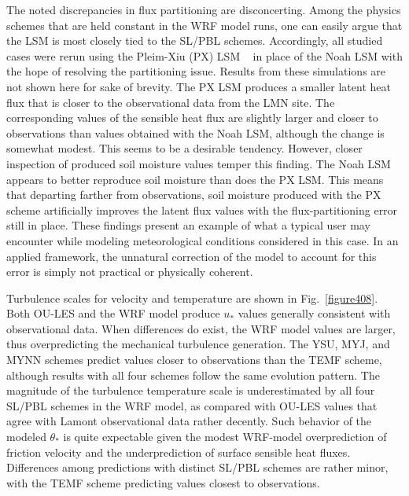 The noted discrepancies in flux partitioning are disconcerting. Among the physics schemes that are held constant in the WRF model runs, one can easily argue that the LSM is most closely tied to the SL\slash PBL schemes. Accordingly, all studied cases were rerun using the Pleim-Xiu (PX) LSM ~\citep{PleimXiu95, XiuPleim01} in place of the Noah LSM with the hope of resolving the partitioning issue. Results from these simulations are not shown here for sake of brevity. The PX LSM produces a smaller latent heat flux that is closer to the observational data from the LMN site. The corresponding values of the sensible heat flux are slightly larger and closer to observations than values obtained with the Noah LSM, although the change is somewhat modest. This seems to be a desirable tendency. However, closer inspection of produced soil moisture values temper this finding. The Noah LSM appears to better reproduce soil moisture than does the PX LSM. This means that departing farther from observations, soil moisture produced with the PX scheme artificially improves the latent flux values with the flux-partitioning error still in place. These findings present an example of what a typical user may encounter while modeling meteorological conditions considered in this case. In an applied framework, the unnatural correction of the model to account for this error is simply not practical or physically coherent.

Turbulence scales for velocity and temperature are shown in Fig.~\ref{figure408}. Both OU-LES and the WRF model produce $u_*$ values generally consistent with observational data. When differences do exist, the WRF model values are larger, thus overpredicting the mechanical turbulence generation. The YSU, MYJ, and MYNN schemes predict values closer to observations than the TEMF scheme, although results with all four schemes follow the same evolution pattern. The magnitude of the turbulence temperature scale is underestimated by all four SL\slash PBL schemes in the WRF model, as compared with OU-LES values that agree with Lamont observational data rather decently. Such behavior of the modeled $\theta_*$ is quite expectable given the modest WRF-model overprediction of friction velocity and the underprediction of surface sensible heat fluxes. Differences among predictions with distinct SL\slash PBL schemes are rather minor, with the TEMF scheme predicting values closest to observations.


